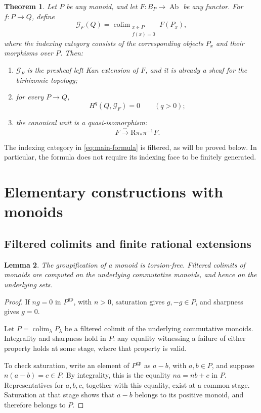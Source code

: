 \documentclass[11pt]{article}
\newtheorem{theorem}{Theorem}[section]
\newtheorem{lemma}[theorem]{Lemma}
\theoremstyle{definition}
\theoremstyle{remark}
\DeclareMathOperator{\colim}{colim}
\DeclareMathOperator{\Ab}{Ab}
\newcommand{\gp}{\mathrm{gp}}
\newcommand{\cG}{\mathcal G}
\begin{document}
\begin{theorem}\label{thm:main}
Let \(P\) be any monoid, and let \(F:B_P\to\Ab\) be any functor.
For \(f:P\to Q\), define
\begin{equation}\label{eq:main-formula}
\cG_F(Q)=
\colim_{\substack{x\in P\\f(x)=0}} F(P_x),
\end{equation}
where the indexing category consists of the corresponding objects
\(P_x\) and their morphisms over \(P\). Then:
\begin{enumerate}[label=\textup{(\roman*)}]
\item \(\cG_F\) is the presheaf left Kan extension of \(F\), and it is
already a sheaf for the birhizomic topology;
\item for every \(P\to Q\),
\[
H^q(Q,\cG_F)=0\qquad(q>0);
\]
\item the canonical unit is a quasi-isomorphism:
\[
F \xrightarrow{\ \sim\ } \mathrm R\pi_*\pi^{-1}F.
\]
\end{enumerate}
\end{theorem}

The indexing category in \eqref{eq:main-formula} is filtered, as will
be proved below. In particular, the formula does not require its
indexing face to be finitely generated.

\section{Elementary constructions with monoids}

\subsection{Filtered colimits and finite rational extensions}
\begin{lemma}\label{lem:filtered}
The groupification of a monoid is torsion-free. Filtered colimits of
monoids are computed on the underlying commutative monoids, and hence
on the underlying sets.
\end{lemma}

\begin{proof}
If \(ng=0\) in \(P^{\gp}\), with \(n>0\), saturation gives
\(g,-g\in P\), and sharpness gives \(g=0\).

Let \(P=\colim_\lambda P_\lambda\) be a filtered colimit of the
underlying commutative monoids. Integrality and sharpness hold in
\(P\): any equality witnessing a failure of either property holds at
some stage, where that property is valid.

To check saturation, write an element of \(P^{\gp}\) as \(a-b\), with
\(a,b\in P\), and suppose \(n(a-b)=c\in P\). By integrality, this is
the equality \(na=nb+c\) in \(P\). Representatives for \(a,b,c\),
together with this equality, exist at a common stage. Saturation at
that stage shows that \(a-b\) belongs to its positive monoid, and
therefore belongs to \(P\).
\end{proof}
\end{document}
